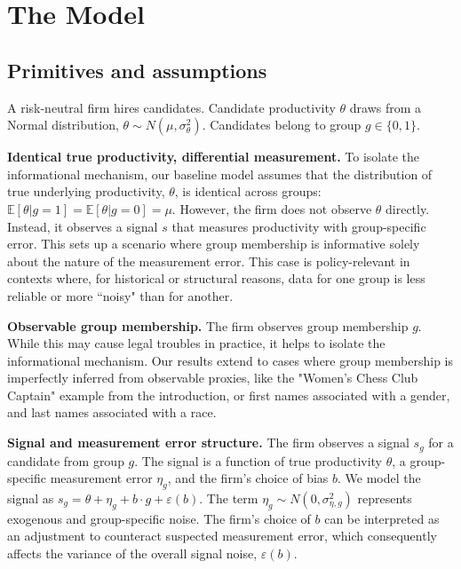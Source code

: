 \section{The Model}

\subsection{Primitives and assumptions}
A risk-neutral firm hires candidates. Candidate productivity $\theta$ draws from a Normal distribution, $\theta \sim N(\mu, \sigma_\theta^2)$. Candidates belong to group $g \in \{0, 1\}$.

\begin{assumption}[A1]
\textbf{Identical true productivity, differential measurement.} To isolate the informational mechanism, our baseline model assumes that the distribution of true underlying productivity, $\theta$, is identical across groups: $\mathbb{E}[\theta|g=1] = \mathbb{E}[\theta|g=0] = \mu$. However, the firm does not observe $\theta$ directly. Instead, it observes a signal $s$ that measures productivity with group-specific error. This sets up a scenario where group membership is informative solely about the nature of the measurement error. This case is policy-relevant in contexts where, for historical or structural reasons, data for one group is less reliable or more ``noisy" than for another.
\end{assumption}

\begin{assumption}[A2]
\textbf{Observable group membership.} The firm observes group membership $g$. While this may cause legal troubles in practice, it helps to isolate the informational mechanism. Our results extend to cases where group membership is imperfectly inferred from observable proxies, like the "Women's Chess Club Captain" example from the introduction, or first names associated with a gender, and last names associated with a race.
\end{assumption}

\begin{assumption}[A3]
\textbf{Signal and measurement error structure.} The firm observes a signal $s_g$ for a candidate from group $g$. The signal is a function of true productivity $\theta$, a group-specific measurement error $\eta_g$, and the firm's choice of bias $b$. We model the signal as $s_g = \theta + \eta_g + b \cdot g + \varepsilon(b)$. The term $\eta_g \sim N(0, \sigma_{\eta,g}^2)$ represents exogenous and group-specific noise. The firm's choice of $b$ can be interpreted as an adjustment to counteract suspected measurement error, which consequently affects the variance of the overall signal noise, $\varepsilon(b)$.
\end{assumption}

